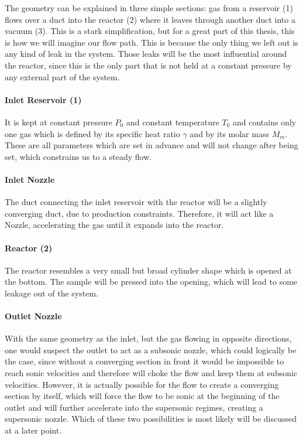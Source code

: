 	The geometry can be explained in three simple sections: gas from a reservoir (1) flows over a duct into the reactor (2) where it leaves through another duct into a vacuum (3).
	This is a stark simplification, but for a great part of this thesis, this is how we will imagine our flow path.
	This is because the only thing we left out is any kind of leak in the system.
	Those leaks will be the most influential around the reactor, since this is the only part that is not held at a constant pressure by any external part of the system.\\
	

\paragraph{Inlet Reservoir (1)}

	It is kept at constant pressure \(P_0\) and constant temperature \(T_0\) and contains only one gas which is defined by its specific heat ratio \(\gamma\) and by its molar mass \(M_m\).
	These are all parameters which are set in advance and will not change after being set, which constrains us to a steady flow.
	
\paragraph{Inlet Nozzle}

	The duct connecting the inlet reservoir with the reactor will be a slightly converging duct, due to production constraints.
	Therefore, it will act like a Nozzle, accelerating the gas until it expands into the reactor.
	
\paragraph{Reactor (2)}
	
	The reactor resembles a very small but broad cylinder shape which is opened at the bottom.
	The sample will be pressed into the opening, which will lead to some leakage out of the system.
	
\paragraph{Outlet Nozzle}
	
	With the same geometry as the inlet, but the gas flowing in opposite directions, one would suspect the outlet to act as a subsonic nozzle, which could logically be the case, since without a converging section in front it would be impossible to reach sonic velocities and therefore will choke the flow and keep them at subsonic velocities.
	However, it is actually possible for the flow to create a converging section by itself, which will force the flow to be sonic at the beginning of the outlet and will further accelerate into the supersonic regimes, creating a supersonic nozzle.
	Which of these two possibilities is most likely will be discussed at a later point.
	
